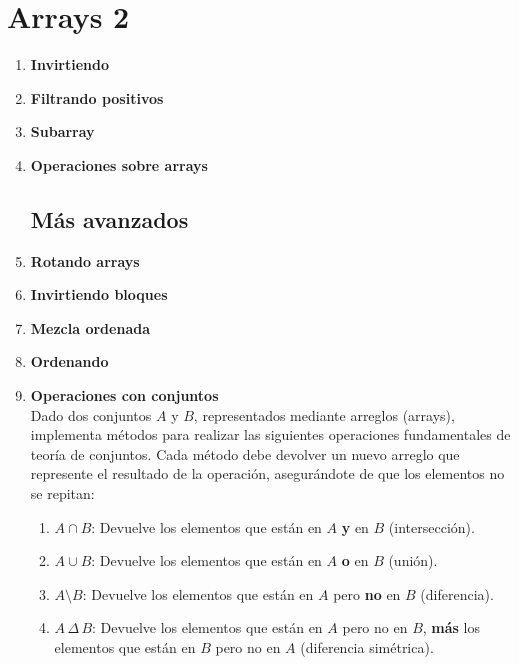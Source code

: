 \section{Arrays 2}
\begin{enumerate}
    \item \textbf{Invirtiendo}\\
    

    \item \textbf{Filtrando positivos}
    

    \item \textbf{Subarray}\\
    

    \item \textbf{Operaciones sobre arrays}
    

\subsection*{Más avanzados}
     \item \textbf{Rotando arrays}\\
    

    \item \textbf{Invirtiendo bloques}\\
    

    \item \textbf{Mezcla ordenada}\\
    

    \item \textbf{Ordenando}\\
    

    \item \textbf{Operaciones con conjuntos}\\
    Dado dos conjuntos \( A \) y \( B \), representados mediante arreglos (arrays), implementa métodos para realizar las siguientes operaciones fundamentales de teoría de conjuntos. Cada método debe devolver un nuevo arreglo que represente el resultado de la operación, asegurándote de que los elementos no se repitan:
    
    \begin{enumerate}
        \item \( A \cap B \): Devuelve los elementos que están en \( A \) \textbf{y} en \( B \) (intersección).
        \item \( A \cup B \): Devuelve los elementos que están en \( A \) \textbf{o} en \( B \) (unión).
        \item \( A \setminus B \): Devuelve los elementos que están en \( A \) pero \textbf{no} en \( B \) (diferencia).
        \item \( A \, \Delta \, B \): Devuelve los elementos que están en \( A \) pero no en \( B \), \textbf{más} los elementos que están en \( B \) pero no en \( A \) (diferencia simétrica).
    \end{enumerate}



\end{enumerate}

